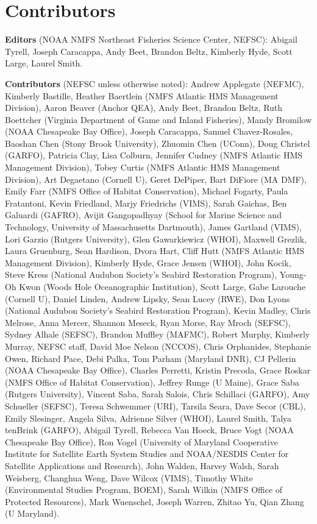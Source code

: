 \documentclass[
  10pt,
]{article}
\begin{document}
\section{Contributors}\label{contributors}

\textbf{Editors} (NOAA NMFS Northeast Fisheries Science Center, NEFSC): Abigail Tyrell, Joseph Caracappa, Andy Beet, Brandon Beltz, Kimberly Hyde, Scott Large, Laurel Smith.

\textbf{Contributors} (NEFSC unless otherwise noted): Andrew Applegate (NEFMC), Kimberly Bastille, Heather Baertlein (NMFS Atlantic HMS Management Division), Aaron Beaver (Anchor QEA), Andy Beet, Brandon Beltz, Ruth Boettcher (Virginia Department of Game and Inland Fisheries), Mandy Bromilow (NOAA Chesapeake Bay Office), Joseph Caracappa, Samuel Chavez-Rosales, Baoshan Chen (Stony Brook University), Zhuomin Chen (UConn), Doug Christel (GARFO), Patricia Clay, Lisa Colburn, Jennifer Cudney (NMFS Atlantic HMS Management Division), Tobey Curtis (NMFS Atlantic HMS Management Division), Art Degaetano (Cornell U), Geret DePiper, Bart DiFiore (MA DMF), Emily Farr (NMFS Office of Habitat Conservation), Michael Fogarty, Paula Fratantoni, Kevin Friedland, Marjy Friedrichs (VIMS), Sarah Gaichas, Ben Galuardi (GAFRO), Avijit Gangopadhyay (School for Marine Science and Technology, University of Massachusetts Dartmouth), James Gartland (VIMS), Lori Garzio (Rutgers University), Glen Gawarkiewicz (WHOI), Maxwell Grezlik, Laura Gruenburg, Sean Hardison, Dvora Hart, Cliff Hutt (NMFS Atlantic HMS Management Division), Kimberly Hyde, Grace Jensen (WHOI), John Kocik, Steve Kress (National Audubon Society's Seabird Restoration Program), Young-Oh Kwon (Woods Hole Oceanographic Institution), Scott Large, Gabe Larouche (Cornell U), Daniel Linden, Andrew Lipsky, Sean Lucey (RWE), Don Lyons (National Audubon Society's Seabird Restoration Program), Kevin Madley, Chris Melrose, Anna Mercer, Shannon Meseck, Ryan Morse, Ray Mroch (SEFSC), Sydney Alhale (SEFSC), Brandon Muffley (MAFMC), Robert Murphy, Kimberly Murray, NEFSC staff, David Moe Nelson (NCCOS), Chris Orphanides, Stephanie Owen, Richard Pace, Debi Palka, Tom Parham (Maryland DNR), CJ Pellerin (NOAA Chesapeake Bay Office), Charles Perretti, Kristin Precoda, Grace Roskar (NMFS Office of Habitat Conservation), Jeffrey Runge (U Maine), Grace Saba (Rutgers University), Vincent Saba, Sarah Salois, Chris Schillaci (GARFO), Amy Schueller (SEFSC), Teresa Schwemmer (URI), Tarsila Seara, Dave Secor (CBL), Emily Slesinger, Angela Silva, Adrienne Silver (WHOI), Laurel Smith, Talya tenBrink (GARFO), Abigail Tyrell, Rebecca Van Hoeck, Bruce Vogt (NOAA Chesapeake Bay Office), Ron Vogel (University of Maryland Cooperative Institute for Satellite Earth System Studies and NOAA/NESDIS Center for Satellite Applications and Research), John Walden, Harvey Walsh, Sarah Weisberg, Changhua Weng, Dave Wilcox (VIMS), Timothy White (Environmental Studies Program, BOEM), Sarah Wilkin (NMFS Office of Protected Resources), Mark Wuenschel, Joseph Warren, Zhitao Yu, Qian Zhang (U Maryland).
\end{document}
